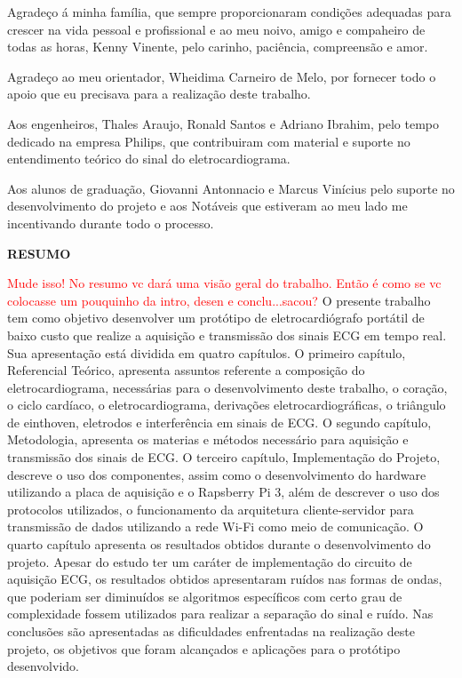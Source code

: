 \documentclass[12pt, a4paper]{article}
\begin{document}
\hspace*{0.8cm} Agradeço á minha família, que sempre proporcionaram condições adequadas para crescer na vida pessoal e profissional e ao meu noivo, amigo e compaheiro de todas as horas, Kenny Vinente, pelo carinho, paciência, compreensão e amor.

\hspace*{0.8cm} Agradeço ao meu orientador, Wheidima Carneiro de Melo, por fornecer todo o apoio que eu precisava para a realização deste trabalho.


\hspace*{0.8cm}Aos engenheiros, Thales Araujo, Ronald Santos e Adriano Ibrahim, pelo tempo dedicado na empresa Philips, que contribuiram com material e suporte no entendimento teórico do sinal do eletrocardiograma.


\hspace*{0.8cm}Aos alunos de graduação, Giovanni Antonnacio e Marcus Vinícius pelo suporte no desenvolvimento do projeto e aos Notáveis que estiveram ao meu lado me incentivando durante todo o processo.




\newpage


\thispagestyle{empty}
\vspace*{4.4cm}
{\begin{center}\textbf{\normalsize RESUMO}\vspace{36pt}\end{center}}
\textcolor{red}{Mude isso! No resumo vc dará uma visão geral do trabalho. Então é como se vc colocasse um pouquinho da intro, desen e conclu...sacou?}
O presente trabalho tem como objetivo desenvolver um protótipo de eletrocardiógrafo portátil de baixo custo que realize a aquisição e transmissão dos sinais ECG em tempo real. Sua apresentação está dividida em quatro capítulos. O primeiro capítulo, Referencial Teórico, apresenta assuntos referente a composição do eletrocardiograma, necessárias para o desenvolvimento deste trabalho, o coração, o ciclo cardíaco, o eletrocardiograma, derivações eletrocardiográficas, o triângulo de einthoven, eletrodos e interferência em sinais de ECG. O segundo capítulo, Metodologia, apresenta os materias e métodos necessário para aquisição e transmissão dos sinais de ECG. O terceiro capítulo, Implementação do Projeto, descreve o uso dos componentes, assim como o desenvolvimento do hardware utilizando a placa de aquisição e o Rapsberry Pi 3, além de descrever o uso dos protocolos utilizados, o funcionamento da arquitetura cliente-servidor para transmissão de dados utilizando a rede Wi-Fi como meio de comunicação. O quarto capítulo apresenta os resultados obtidos durante o desenvolvimento do projeto. Apesar do estudo ter um caráter de implementação do circuito de aquisição ECG, os resultados obtidos apresentaram ruídos nas formas de ondas, que poderiam ser diminuídos se algoritmos específicos com certo grau de complexidade fossem utilizados para realizar a separação do sinal e ruído. Nas conclusões são apresentadas as dificuldades enfrentadas na realização deste projeto, os objetivos que foram alcançados e aplicações para o protótipo desenvolvido.
\end{document}
